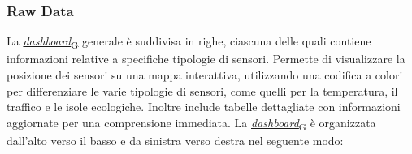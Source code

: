 \subsubsection{Raw Data}
La \href{https://7last.github.io/docs/pb/documentazione-interna/glossario\#dashboard}{\textit{dashboard}\textsubscript{G}} generale è suddivisa in righe, ciascuna delle quali contiene informazioni relative a specifiche tipologie di sensori. Permette di visualizzare la posizione dei sensori su una mappa interattiva, utilizzando una codifica a colori per differenziare le varie tipologie di sensori, come quelli per la temperatura, il traffico e le isole ecologiche. Inoltre include tabelle dettagliate con informazioni aggiornate per una comprensione immediata. La \href{https://7last.github.io/docs/pb/documentazione-interna/glossario\#dashboard}{\textit{dashboard}\textsubscript{G}} è organizzata dall'alto verso il basso e da sinistra verso destra nel seguente modo:
